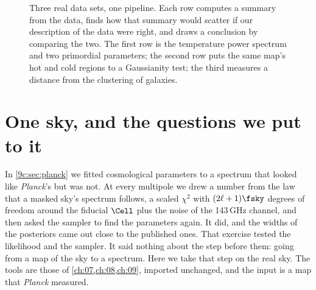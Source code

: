 \begin{figure}[htbp]
\centering
{}
\caption{Three real data sets, one pipeline. Each row computes a summary from the data, finds how that
summary would scatter if our description of the data were right, and draws a conclusion by comparing the
two. The first row is the temperature power spectrum and two primordial parameters; the second row
puts the same map's hot and cold regions to a Gaussianity test; the third measures a distance from the
clustering of galaxies.}
\label{13a:fig:roadmap}
\end{figure}

\section{One sky, and the questions we put to it}
\label{13a:sec:question}

In \cref{9c:sec:planck} we fitted cosmological parameters to a spectrum that looked like \textit{Planck}'s
but was not. At every multipole we drew a number from the law that a masked sky's spectrum
follows, a scaled $\chi^2$ with $(2\ell+1)\fsky$ degrees of freedom around the fiducial $\Cell$ plus the noise of
the 143\,GHz channel, and then asked the sampler to find the parameters again. It did, and the widths of
the posteriors came out close to the published ones. That exercise tested the likelihood and the sampler.
It said nothing about the step before them: going from a map of the sky to a spectrum. Here we take that
step on the real sky. The tools are those of \cref{ch:07,ch:08,ch:09}, imported unchanged, and the
input is a map that \textit{Planck} measured.

